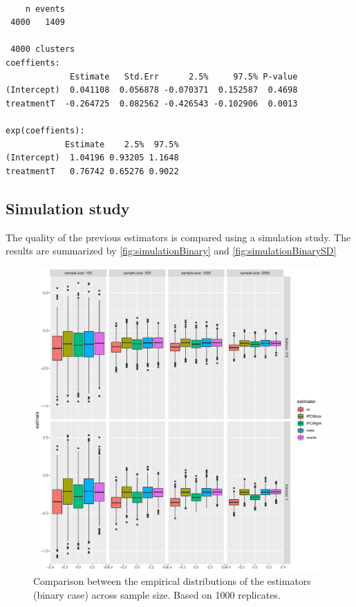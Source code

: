 \documentclass[12pt]{article}
\begin{document}
\begin{verbatim}

    n events
 4000   1409

 4000 clusters
coeffients:
             Estimate   Std.Err      2.5%     97.5% P-value
(Intercept)  0.041108  0.056878 -0.070371  0.152587  0.4698
treatmentT  -0.264725  0.082562 -0.426543 -0.102906  0.0013

exp(coeffients):
            Estimate    2.5%  97.5%
(Intercept)  1.04196 0.93205 1.1648
treatmentT   0.76742 0.65276 0.9022
\end{verbatim}



\subsection{Simulation study}
\label{sec:orgf723787}

The quality of the previous estimators is compared using a simulation
study. The results are summarized by \autoref{fig:simulationBinary} and \autoref{fig:simulationBinarySD} 
\begin{figure}[!h]
\centering
\includegraphics[width=\textwidth]{./figures/simStudy-bin-bias.pdf}
\caption{\label{fig:simulationBinary}Comparison between the empirical distributions of the estimators (binary case) across sample size. Based on 1000 replicates.}
\end{figure}
\end{document}
